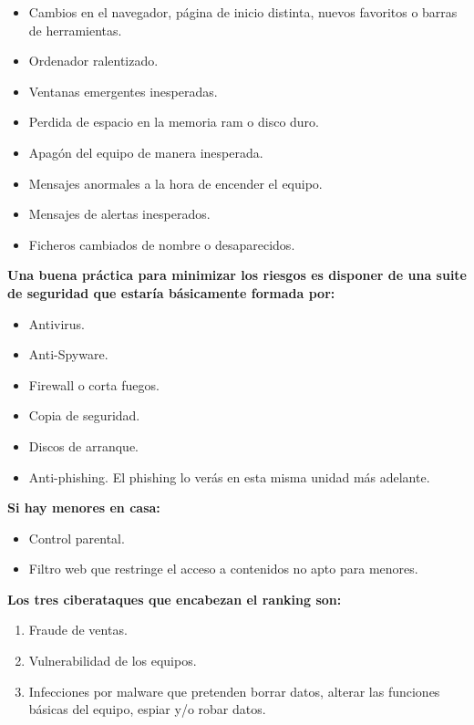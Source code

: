 \documentclass[
  spanish,
  a4paper,
  openany]{book}
\begin{document}
\begin{itemize}
\item
  Cambios en el navegador, página de inicio distinta, nuevos favoritos o barras de herramientas.
\item
  Ordenador ralentizado.
\item
  Ventanas emergentes inesperadas.
\item
  Perdida de espacio en la memoria ram o disco duro.
\item
  Apagón del equipo de manera inesperada.
\item
  Mensajes anormales a la hora de encender el equipo.
\item
  Mensajes de alertas inesperados.
\item
  Ficheros cambiados de nombre o desaparecidos.
\end{itemize}

\textbf{Una buena práctica para minimizar los riesgos es disponer de una suite de seguridad que estaría básicamente formada por:}

\begin{itemize}
\item
  Antivirus.
\item
  Anti-Spyware.
\item
  Firewall o corta fuegos.
\item
  Copia de seguridad.
\item
  Discos de arranque.
\item
  Anti-phishing. El phishing lo verás en esta misma unidad más adelante.
\end{itemize}

\textbf{Si hay menores en casa:}

\begin{itemize}
\item
  Control parental.
\item
  Filtro web que restringe el acceso a contenidos no apto para menores.
\end{itemize}

\textbf{Los tres ciberataques que encabezan el ranking son:}

\begin{enumerate}
\def\labelenumi{\arabic{enumi}.}
\item
  Fraude de ventas.
\item
  Vulnerabilidad de los equipos.
\item
  Infecciones por malware que pretenden borrar datos, alterar las funciones básicas del equipo, espiar y/o robar datos.
\end{enumerate}
\end{document}
